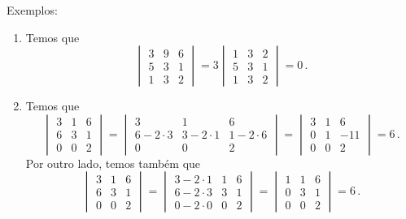 \documentclass[12pt,a4paper]{report}
\begin{document}
Exemplos:
\begin{enumerate}
  \item Temos que
  $$\begin{vmatrix}
    3&9&6\\
    5&3&1\\
    1&3&2
  \end{vmatrix}=3\begin{vmatrix}
    1&3&2\\
    5&3&1\\
    1&3&2
  \end{vmatrix}=0\,.$$
  \item Temos que
  $$\begin{vmatrix}
    3&1&6\\
    6&3&1\\
    0&0&2
  \end{vmatrix}=\begin{vmatrix}
    3&1&6\\
    6-2\cdot 3&3-2\cdot1&1-2\cdot 6\\
    0&0&2
  \end{vmatrix}=\begin{vmatrix}
    3&1&6\\
    0&1&-11\\
    0&0&2
  \end{vmatrix}=6\,.$$
  Por outro lado, temos também que
  $$\begin{vmatrix}
    3&1&6\\
    6&3&1\\
    0&0&2
  \end{vmatrix}=\begin{vmatrix}
    3-2\cdot 1&1&6\\
    6-2\cdot 3&3&1\\
    0-2\cdot 0&0&2
  \end{vmatrix}=\begin{vmatrix}
    1&1&6\\
    0&3&1\\
    0&0&2
  \end{vmatrix}=6\,.$$
\end{enumerate}
\end{document}
